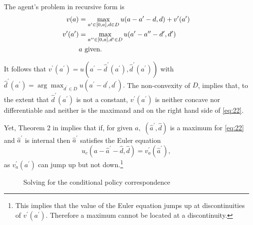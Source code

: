 \documentclass[a4paper,dvips,12pt]{article}
\begin{document}
The agent's problem in recursive form is
\begin{align}  \label{eq:22}
v(a)&=\max_{a^{\prime }\in[0,a],d\in D}u(a-a^{\prime }-d,d)+v^{\prime
}(a^{\prime }) \\
v^{\prime }(a^{\prime })&=\max_{ a^{\prime \prime }\in[0,a],d^{\prime }\in
D}u(a^{\prime }-a^{\prime \prime }-d^{\prime },d^{\prime })  \notag \\
& a\ \text{given}.  \notag
\end{align}

It follows that $v^{\prime }(a^{\prime })=u(a^{\prime }-\hat d^{\prime
}(a^{\prime }),\hat d^{\prime }(a^{\prime }))$ with $\hat d^{\prime
}(a^{\prime })=\arg \max_{d^{\prime }\in D}u(a^{\prime }-d^{\prime
},d^{\prime }).$ The non-convexity of $D$, implies that, to the extent that $%
\hat d^{\prime }(a^{\prime })$ is not a constant, $v^{\prime }(a^{\prime })$
is neither concave nor differentiable and neither is the maximand and on the
right hand side of \eqref{eq:22}.

Yet, Theorem 2 in  implies that if, for given $%
a,$ $(\hat a^{\prime },\hat d)$ is a maximum for \eqref{eq:22} and $\hat
a^{\prime }$ is internal then $\hat a^{\prime }$ satisfies the Euler
equation
\begin{equation}  \label{eq:23}
u_{c}(a-\hat a^{\prime }-\hat d,\hat d)=v^{\prime }_{a}(\hat a^{\prime }),
\tag{EE}
\end{equation}
as $v^{\prime }_{a}(a^{\prime })$ can jump up but not down.\footnote{%
This implies that the value of the Euler equation jumps up at
discontinuities of $v^{\prime }(a^{\prime }).$ Therefore a maximum cannot be
located at a discontinuity.}

\setlength{\fboxrule}{0.1mm}
\setlength{\fboxsep}{5mm}
\begin{figure}[t]
  \caption{Solving for the conditional policy correspondence}
  \label{fig:egm}
\begin{center}
\end{center}
\end{figure}
\end{document}
